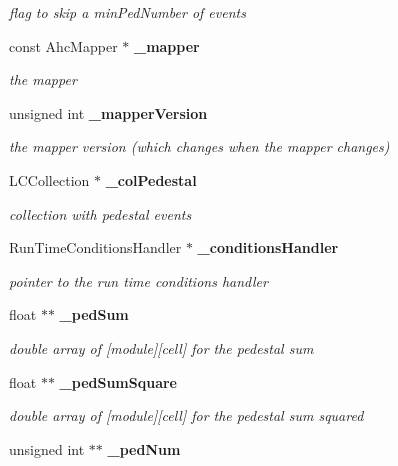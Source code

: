 \begin{DoxyCompactItemize}
\begin{DoxyCompactList}\small\item\em flag to skip a min\-Ped\-Number of events \end{DoxyCompactList}\item 
const Ahc\-Mapper $\ast$ {\bf \-\_\-mapper}\label{classCALICE_1_1PedestalProcessor_ae5162fd017ae4a1abb03921d3bb3bfba}

\begin{DoxyCompactList}\small\item\em the mapper \end{DoxyCompactList}\item 
unsigned int {\bf \-\_\-mapper\-Version}\label{classCALICE_1_1PedestalProcessor_aef19163d8be045f83115d034221a3489}

\begin{DoxyCompactList}\small\item\em the mapper version (which changes when the mapper changes) \end{DoxyCompactList}\item 
L\-C\-Collection $\ast$ {\bf \-\_\-col\-Pedestal}\label{classCALICE_1_1PedestalProcessor_ab0c600b05c496702970da836d970cd48}

\begin{DoxyCompactList}\small\item\em collection with pedestal events \end{DoxyCompactList}\item 
Run\-Time\-Conditions\-Handler $\ast$ {\bf \-\_\-conditions\-Handler}\label{classCALICE_1_1PedestalProcessor_a3a39a6ea9341d4a6595227bc3947b4ac}

\begin{DoxyCompactList}\small\item\em pointer to the run time conditions handler \end{DoxyCompactList}\item 
float $\ast$$\ast$ {\bf \-\_\-ped\-Sum}\label{classCALICE_1_1PedestalProcessor_a7659ed593bf1fa8c4d6fea3332976765}

\begin{DoxyCompactList}\small\item\em double array of [module][cell] for the pedestal sum \end{DoxyCompactList}\item 
float $\ast$$\ast$ {\bf \-\_\-ped\-Sum\-Square}\label{classCALICE_1_1PedestalProcessor_a9e0ddd7ae0bba557fd530741f6d386e5}

\begin{DoxyCompactList}\small\item\em double array of [module][cell] for the pedestal sum squared \end{DoxyCompactList}\item 
unsigned int $\ast$$\ast$ {\bf \-\_\-ped\-Num}\label{classCALICE_1_1PedestalProcessor_a9460997dc6fe25a8e362a93b20bc3ef9}


\end{DoxyCompactItemize}
